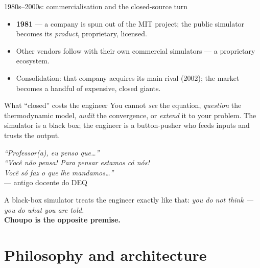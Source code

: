 \documentclass[aspectratio=169,11pt]{beamer}
\begin{document}
\begin{frame}{1980s--2000s: commercialisation and the closed-source turn}
\begin{itemize}
  \item \textbf{1981} --- a company is spun out of the MIT project; the public
        simulator becomes its \emph{product}, proprietary, licensed.
  \item Other vendors follow with their own commercial simulators --- a proprietary
        ecosystem.
  \item Consolidation: that company acquires its main rival (2002); the market
        becomes a handful of expensive, closed giants.
\end{itemize}
\vspace{0.4em}
\begin{alertblock}{What ``closed'' costs the engineer}
You cannot \emph{see} the equation, \emph{question} the thermodynamic model,
\emph{audit} the convergence, or \emph{extend} it to your problem. The simulator
is a black box; the engineer is a button-pusher who feeds inputs and trusts the
output.
\end{alertblock}
\end{frame}

\begin{frame}{}
\centering
\vspace{1.2em}
{\Large\itshape ``Professor(a), eu penso que\ldots''}\\[1.0em]
{\Large\itshape ``Voc\^e n\~ao pensa! Para pensar estamos c\'a n\'os!\\
Voc\^e s\'o faz o que lhe mandamos\ldots''}\\[1.4em]
{\normalsize --- antigo docente do DEQ}\\[2.0em]
\begin{block}{}
\centering A black-box simulator treats the engineer exactly like that:
\emph{you do not think --- you do what you are told.}\\[0.3em]
\textbf{Choupo is the opposite premise.}
\end{block}
\end{frame}

\section{Philosophy and architecture}
\end{document}
